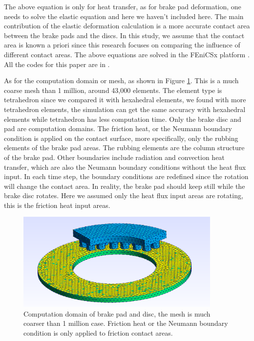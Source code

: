 The above equation is only for heat transfer, as for brake pad deformation, one needs to solve the elastic equation and here we haven't included here. The main contribution of the elastic deformation calculation is a more accurate contact area between the brake pads and the discs. In this study, we assume that the contact area is known a priori since this research focuses on comparing the influence of different contact areas. The above equations are solved in the FEniCSx platform \cite{baratta_dolfinx_2023,scroggs_construction_2022,alnaes_unified_2014}. All the codes for this paper are in \cite{zhang_thermal_2025}.

As for the computation domain or mesh, as shown in Figure \ref{fig:coarse mesh}. This is a much coarse mesh than 1 million, around 43,000 elements. The element type is tetrahedron since we compared it with hexahedral elements, we found with more tetrahedron elements, the simulation can get the same accuracy with hexahedral elements while tetrahedron has less computation time. Only the brake disc and pad are computation domains. The friction heat, or the Neumann boundary condition is applied on the contact surface, more specifically, only the rubbing elements of the brake pad areas. The rubbing elements are the column structure of the brake pad. Other boundaries include radiation and convection heat transfer, which are also the Neumann boundary conditions without the heat flux input. In each time step, the boundary conditions are redefined since the rotation will change the contact area. In reality, the brake pad should keep still while the brake disc rotates. Here we assumed only the heat flux input areas are rotating, this is the friction heat input areas.

\begin{figure}[h]
    \centering
    \includegraphics[width=0.9\textwidth]{book/chapters/zhang/graphics/3d surface.png}
    \caption{Computation domain of brake pad and disc, the mesh is much coarser than 1 million case. Friction heat or the Neumann boundary condition is only applied to friction contact areas.}
    \label{fig:coarse mesh}
\end{figure}



